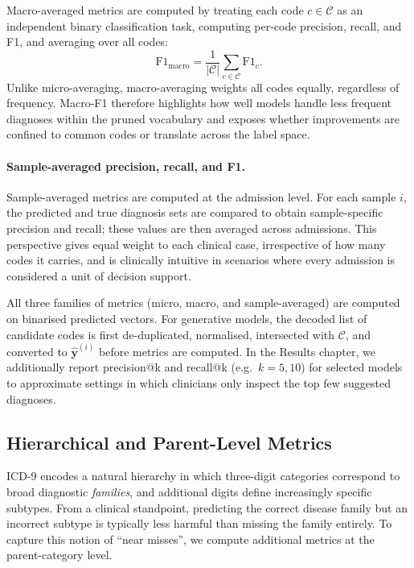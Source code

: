 Macro-averaged metrics are computed by treating each code $c \in \mathcal{C}$ as an independent binary classification task, computing per-code precision, recall, and F1, and averaging over all codes:
\[
    \text{F1}_{\text{macro}} = \frac{1}{|\mathcal{C}|} \sum_{c \in \mathcal{C}} \text{F1}_c.
\]
Unlike micro-averaging, macro-averaging weights all codes equally, regardless of frequency. Macro-F1 therefore highlights how well models handle less frequent diagnoses within the pruned vocabulary and exposes whether improvements are confined to common codes or translate across the label space.

\paragraph{Sample-averaged precision, recall, and F1.}

Sample-averaged metrics are computed at the admission level. For each sample $i$, the predicted and true diagnosis sets are compared to obtain sample-specific precision and recall; these values are then averaged across admissions. This perspective gives equal weight to each clinical case, irrespective of how many codes it carries, and is clinically intuitive in scenarios where every admission is considered a unit of decision support.

All three families of metrics (micro, macro, and sample-averaged) are computed on binarised predicted vectors. For generative models, the decoded list of candidate codes is first de-duplicated, normalised, intersected with $\mathcal{C}$, and converted to $\hat{\mathbf{y}}^{(i)}$ before metrics are computed. In the Results chapter, we additionally report precision@k and recall@k (e.g.\ $k=5,10$) for selected models to approximate settings in which clinicians only inspect the top few suggested diagnoses.

\subsection{Hierarchical and Parent-Level Metrics}
\label{subsec:hierarchical-metrics}

ICD-9 encodes a natural hierarchy in which three-digit categories correspond to broad diagnostic \emph{families}, and additional digits define increasingly specific subtypes. From a clinical standpoint, predicting the correct disease family but an incorrect subtype is typically less harmful than missing the family entirely. To capture this notion of ``near misses'', we compute additional metrics at the parent-category level.

